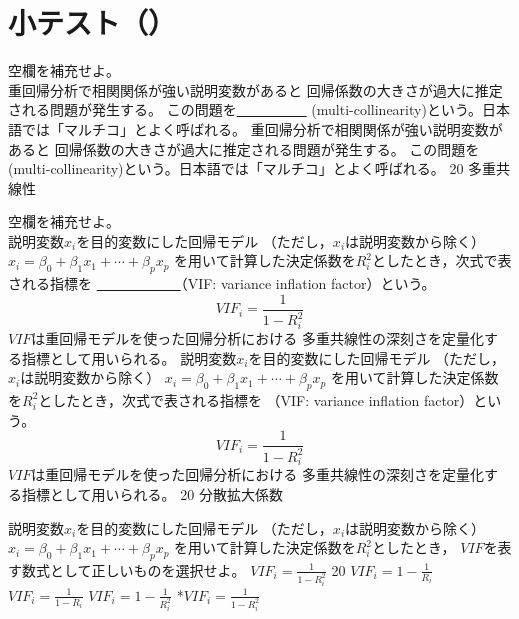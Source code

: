 \newcommand{\Release}{}
\newcommand{\Slide}{}
\newcommand{\PrintLecture}{1}
\newcommand{\PrintSolution}{1}







\maketitle

\section{小テスト（\MyClass）}

\begin{quiz}{\MyClass}

\QuizShortAnswer
{
  空欄を補充せよ。\\
  重回帰分析で相関関係が強い説明変数があると
  回帰係数の大きさが過大に推定される問題が発生する。
  この問題を\underline{　　　　　}
  (multi-collinearity)という。日本語では「マルチコ」とよく呼ばれる。
}
{
  重回帰分析で相関関係が強い説明変数があると
  回帰係数の大きさが過大に推定される問題が発生する。
  この問題を
  (multi-collinearity)という。日本語では「マルチコ」とよく呼ばれる。
}
{20}
{多重共線性}
{}
{}
{}

\QuizShortAnswer
{
  空欄を補充せよ。\\
  説明変数$x_i$を目的変数にした回帰モデル
  （ただし，$x_i$は説明変数から除く）
  $x_i = \beta_0 + \beta_1 x_1 + \cdots + \beta_p x_p$
  を用いて計算した決定係数を$R_i^2$としたとき，次式で表される指標を
  \underline{　　　　　　}（VIF: variance inflation factor）という。
  \[VIF_i = \frac{1}{1-R_i^2}\]
  $VIF$は重回帰モデルを使った回帰分析における
  多重共線性の深刻さを定量化する指標として用いられる。
}
{
  説明変数$x_i$を目的変数にした回帰モデル
  （ただし，$x_i$は説明変数から除く）
  $x_i = \beta_0 + \beta_1 x_1 + \cdots + \beta_p x_p$
  を用いて計算した決定係数を$R_i^2$としたとき，次式で表される指標を
  （VIF: variance inflation factor）という。
  \[VIF_i = \frac{1}{1-R_i^2}\]
  $VIF$は重回帰モデルを使った回帰分析における
  多重共線性の深刻さを定量化する指標として用いられる。
}
{20}
{分散拡大係数}
{}
{}
{}

\QuizMultipleChoices
{
  説明変数$x_i$を目的変数にした回帰モデル
  （ただし，$x_i$は説明変数から除く）
  $x_i = \beta_0 + \beta_1 x_1 + \cdots + \beta_p x_p$
  を用いて計算した決定係数を$R_i^2$としたとき，
  $VIF$を表す数式として正しいものを選択せよ。
}
{
  $VIF_i = \frac{1}{1-R_i^2}$
}
{20}
{ $VIF_i = 1-\frac{1}{R_i}$}
{ $VIF_i = \frac{1}{1-R_i}$}
{ $VIF_i = 1-\frac{1}{R_i^2}$}
{*$VIF_i = \frac{1}{1-R_i^2}$}


\end{quiz}
